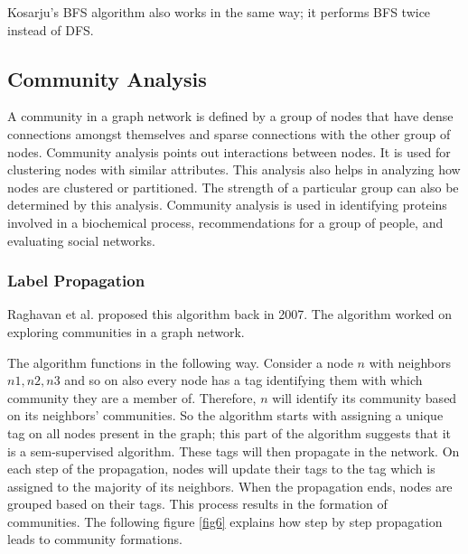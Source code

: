 \documentclass[journal,twoside,web]{ieeecolor}
\begin{document}
Kosarju's BFS algorithm also works in the same way; it performs BFS twice instead of DFS.

\subsection{Community Analysis}
A community in a graph network is defined by a group of nodes that have dense connections amongst themselves and sparse connections with the other group of nodes. Community analysis points out interactions between nodes. It is used for clustering nodes with similar attributes. This analysis also helps in analyzing how nodes are clustered or partitioned. The strength of a particular group can also be determined by this analysis. Community analysis is used in identifying proteins involved in a biochemical process, recommendations for a group of people, and evaluating social networks. 

\subsubsection{Label Propagation}
Raghavan et al. proposed this algorithm back in 2007\cite{16}. The algorithm worked on exploring communities in a graph network. 

The algorithm functions in the following way. Consider a node $n$ with neighbors $n1, n2, n3$ and so on also every node has a tag identifying them with which community they are a member of. Therefore, $n$ will identify its community based on its neighbors' communities. So the algorithm starts with assigning a unique tag on all nodes present in the graph; this part of the algorithm suggests that it is a sem-supervised algorithm. These tags will then propagate in the network. On each step of the propagation, nodes will update their tags to the tag which is assigned to the majority of its neighbors. When the propagation ends, nodes are grouped based on their tags. This process results in the formation of communities. The following figure \ref{fig6} explains how step by step propagation leads to community formations.
\end{document}
